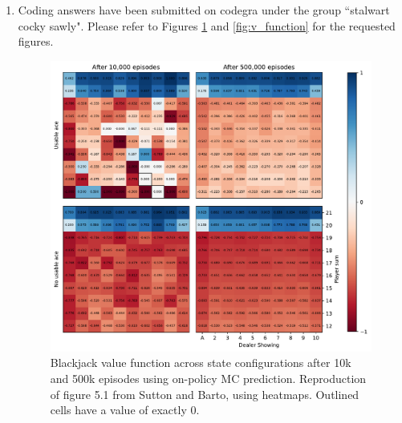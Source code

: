 \documentclass{article}
\begin{document}
\begin{enumerate}
	\item Coding answers have been submitted on codegra under the group ``stalwart cocky sawly".
	      Please refer to Figures \ref{fig:figure_5.1} and \ref{fig:v_function} for the requested figures.
	      \begin{figure}[ht]
		      \centering
		      \includegraphics[width=\textwidth]{fig_5.1}
		      \caption{Blackjack value function across state configurations after 10k and 500k episodes
			      using on-policy MC prediction. Reproduction of figure 5.1 from Sutton and Barto, using
			      heatmaps. Outlined cells have a value of exactly 0.}
		      \label{fig:figure_5.1}
	      \end{figure}


\end{enumerate}
\end{document}
